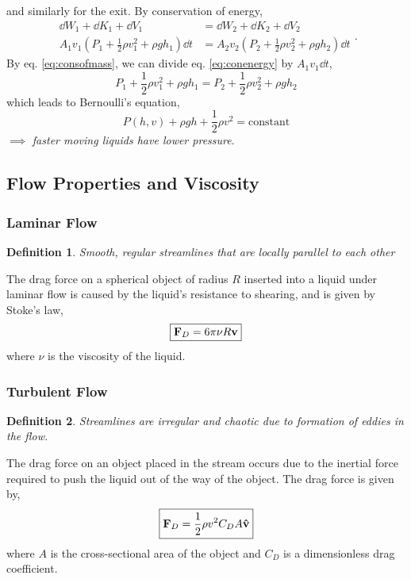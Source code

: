 \documentclass{book}
\newtheorem*{definition}{Definition}
\begin{document}
and similarly for the exit. By conservation of energy,
\begin{equation}
	\begin{split}
		\dd{W}_1 + \dd{K}_1 + \dd{V}_1 & = \dd{W}_2 + \dd{K}_2 + \dd{V}_2 \\
		A_1v_1\left(P_1 + \frac{1}{2}\rho v_1^2 + \rho g h_1\right)\dd{t} & = A_2v_2\left(P_2 + \frac{1}{2}\rho v_2^2 + \rho g h_2\right)\dd{t}
	\end{split}.\label{eq:conenergy}
\end{equation}
By eq. \eqref{eq:consofmass}, we can divide eq. \eqref{eq:conenergy} by $A_1v_1\dd{t}$,
\begin{equation}
	P_1 + \frac{1}{2}\rho v_1^2 + \rho g h_1 = P_2 + \frac{1}{2}\rho v_2^2 + \rho g h_2
\end{equation}
which leads to Bernoulli's equation,
\begin{equation}
	\boxed{P(h,v) + \rho g h + \frac{1}{2}\rho v^2 = \text{constant}}
\end{equation}
$\implies$ \textit{faster moving liquids have lower pressure}.
\subsection{Flow Properties and Viscosity}
\subsubsection{Laminar Flow}
\begin{definition}
	Smooth, regular streamlines that are locally parallel to each other
\end{definition}\noindent
The drag force on a spherical object of radius $R$ inserted into a liquid under laminar flow is caused by the liquid's resistance to shearing, and is given by Stoke's law,
\begin{equation}
	\boxed{\vb{F}_D = 6\pi \nu R\vb{v}}
\end{equation}
where $\nu$ is the viscosity of the liquid.
\subsubsection{Turbulent Flow}
\begin{definition}
	Streamlines are irregular and chaotic due to formation of eddies in the flow.
\end{definition}\noindent
The drag force on an object placed in the stream occurs due to the inertial force required to push the liquid out of the way of the object. The drag force is given by,
\begin{equation}
	\boxed{\vb{F}_D = \frac{1}{2}\rho v^2 C_D A \vu{v}}
\end{equation}
where $A$ is the cross-sectional area of the object and $C_D$ is a dimensionless drag coefficient.
\end{document}
